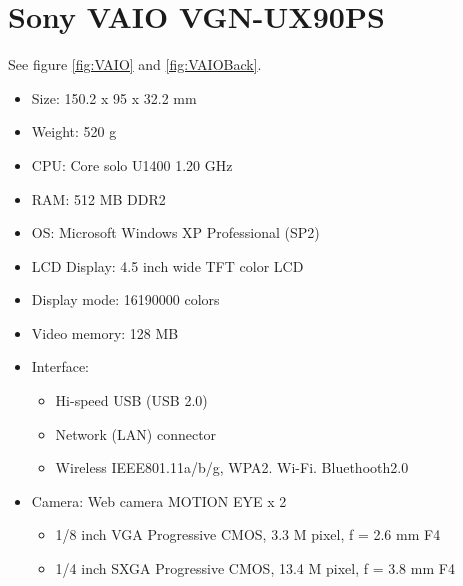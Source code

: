 \chapter{Sony VAIO VGN-UX90PS}
\label{AppendixA}

See figure \ref{fig:VAIO} and \ref{fig:VAIOBack}.

\begin{itemize}
	\item Size: 150.2 x 95 x 32.2 mm
	\item Weight: 520 g
	\item CPU: Core solo U1400 1.20 GHz
	\item RAM: 512 MB DDR2
	\item OS: Microsoft Windows XP Professional (SP2)
	\item LCD Display: 4.5 inch wide TFT color LCD
	\item Display mode: 16190000 colors
	\item Video memory: 128 MB
	\item Interface:
		\begin{itemize}
			\item Hi-speed USB (USB 2.0)
			\item Network (LAN) connector
			\item Wireless IEEE801.11a/b/g, WPA2. Wi-Fi. Bluethooth2.0
		\end{itemize}
	\item Camera: Web camera MOTION EYE x 2
		\begin{itemize}
			\item 1/8 inch VGA Progressive CMOS, 3.3 M pixel, f = 2.6 mm F4
			\item 1/4 inch SXGA Progressive CMOS, 13.4 M pixel, f = 3.8 mm F4
		\end{itemize}
\end{itemize}
